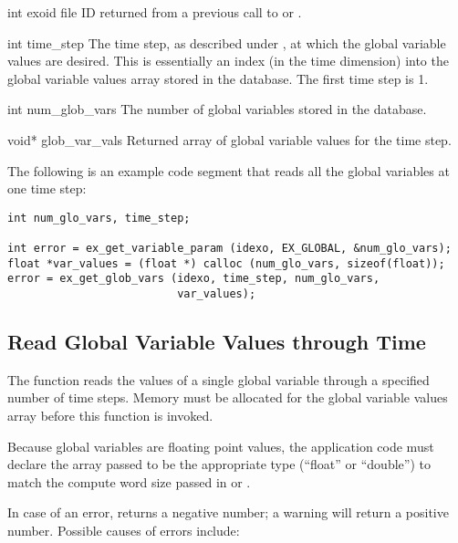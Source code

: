\begin{parameters}
\item[{int exoid \R{}}]
\exo{} file ID returned from a previous call to 
or .

\item[{int time_step \R{}}]
The time step, as described under , at
which the global variable values are desired. This is essentially
an index (in the time dimension) into the global variable values
array stored in the database. The first time step is 1.

\item[{int num_glob_vars \R{}}]
The number of global variables stored in the database.

\item[{void* glob_var_vals \W{}}]
Returned array of  global variable values
for the \th{} time step.
\end{parameters}

The following is an example code segment that reads all the global
variables at one time step:

\begin{lstlisting}
int num_glo_vars, time_step;

int error = ex_get_variable_param (idexo, EX_GLOBAL, &num_glo_vars);
float *var_values = (float *) calloc (num_glo_vars, sizeof(float));
error = ex_get_glob_vars (idexo, time_step, num_glo_vars,
                          var_values);
\end{lstlisting}



\subsection{Read Global Variable Values through Time}

The function  reads the values of a
single global variable through a specified number of time
steps. Memory must be allocated for the global variable values array
before this function is invoked.

Because global variables are floating point values, the application
code must declare the array passed to be the appropriate type
(``float'' or ``double'') to match the compute word size passed in
 or .

In case of an error,  returns a
negative number; a warning will return a positive number. Possible
causes of errors include:

